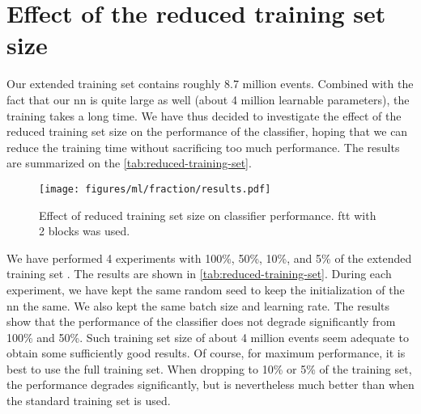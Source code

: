 \section{Effect of the reduced training set size}

Our extended training set contains roughly 8.7 million events. Combined with the fact that our \gls{nn} is quite large
as well (about 4 million learnable parameters), the training takes a long time. We have thus decided to investigate
the effect of the reduced training set size on the performance of the classifier, hoping that we can reduce the
training time without sacrificing too much performance. The results are summarized on the \autoref{tab:reduced-training-set}.

\begin{figure}[htb]
    \centering
    \texttt{[image: figures/ml/fraction/results.pdf]}
    \caption[Effect of reduced training set size on classifier performance]
    {Effect of reduced training set size on classifier performance. \gls{ftt} with 2 blocks was used.}
    \label{tab:reduced-training-set}
\end{figure}

We have performed 4 experiments with 100\%, 50\%, 10\%, and 5\% of the extended training set \ttrn. The results are
shown in \autoref{tab:reduced-training-set}. During each experiment, we have kept the same random seed to keep the
initialization of the \gls{nn} the same. We also kept the same batch size and learning rate. The results show that the
performance of the classifier does not degrade significantly from 100\% and 50\%. Such training set size of about 4
million events seem adequate to obtain some sufficiently good results. Of course, for maximum performance, it is best to
use the full training set. When dropping to 10\% or 5\% of the training set, the performance degrades significantly,
but is nevertheless much better than when the standard training set \ttrn is used.
